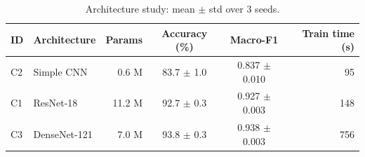 \begin{table}[t]
\caption{Architecture study: mean $\pm$ std over 3 seeds.}
\label{tab:architecture}
\begin{tabular}{llrccr}
\toprule
ID & Architecture & Params & Accuracy (\%) & Macro-F1 & Train time (s) \\
\midrule
C2 & Simple CNN & 0.6 M & 83.7 $\pm$ 1.0 & 0.837 $\pm$ 0.010 & 95 \\
C1 & ResNet-18 & 11.2 M & 92.7 $\pm$ 0.3 & 0.927 $\pm$ 0.003 & 148 \\
C3 & DenseNet-121 & 7.0 M & 93.8 $\pm$ 0.3 & 0.938 $\pm$ 0.003 & 756 \\
\bottomrule
\end{tabular}
\end{table}

